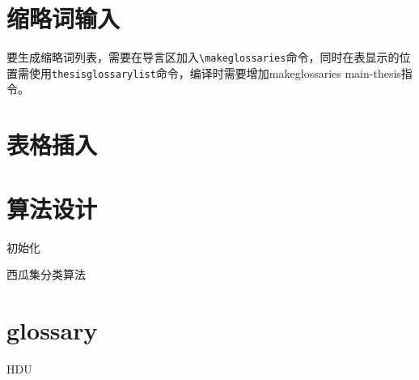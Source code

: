 \section{缩略词输入}

要生成缩略词列表，需要在导言区加入\verb+\makeglossaries+命令，同时在表显示的位置需使用\verb+thesisglossarylist+命令，编译时需要增加makeglossaries main-thesis指令。



\section{表格插入}

\begin{table}[h]
  \caption{工作进度安排}
\centering
{}
\label{gra_process}
\end{table}

\section{算法设计}

\begin{algorithm}[H]
    初始化\;
    \caption{西瓜集分类算法}
\end{algorithm}

\section{glossary}
\gls{HDU}
